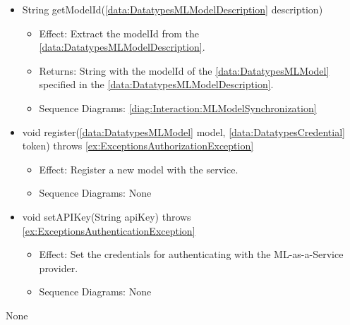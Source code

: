 \begin{description}
\begin{itemize}[noitemsep,nolistsep,leftmargin=-.25cm]
        \begin{itemize}[noitemsep,nolistsep]
           \item Effect: This method retrieves the correct \ref{data:DatatypesMLModelDescription} that corresponds with the \ref{data:DatatypesMLModel} identified by the provided modelId. 
           \item Returns: The \ref{data:DatatypesMLModelDescription} corresponding with the \ref{data:DatatypesMLModel} identified by the modelId.
           \item Sequence Diagrams: None
        \end{itemize}
      \item \textsf{String getModelId(\ref{data:DatatypesMLModelDescription} description)}
        \begin{itemize}[noitemsep,nolistsep]
           \item Effect: Extract the modelId from the \ref{data:DatatypesMLModelDescription}. 
           \item Returns: String with the modelId of the \ref{data:DatatypesMLModel} specified in the \ref{data:DatatypesMLModelDescription}.
           \item Sequence Diagrams: \cref{diag:Interaction:MLModelSynchronization}
        \end{itemize}
      \item \textsf{void register(\ref{data:DatatypesMLModel} model, \ref{data:DatatypesCredential} token) throws \ref{ex:ExceptionsAuthorizationException}}
        \begin{itemize}[noitemsep,nolistsep]
           \item Effect: Register a new model with the  service. 
           \item Sequence Diagrams: None
        \end{itemize}
      \item \textsf{void setAPIKey(String apiKey) throws \ref{ex:ExceptionsAuthenticationException}}
        \begin{itemize}[noitemsep,nolistsep]
           \item Effect: Set the credentials for authenticating with the ML-as-a-Service provider. 
           \item Sequence Diagrams: None
        \end{itemize}
    \end{itemize}
      \item[Diagrams:] None
    \end{description}

